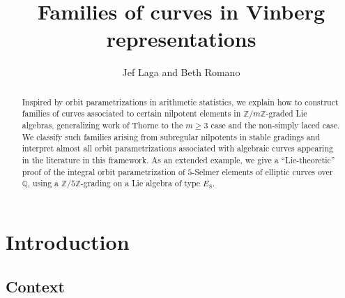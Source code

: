 \documentclass{article} %
\title{Families of curves in Vinberg representations}
\author{Jef Laga and Beth Romano}
\numberwithin{equation}{section}
\theoremstyle{definition}
\newcommand{\Q}{\mathbb{Q}}
\newcommand{\Z}{\mathbb{Z}}
\begin{document}
\maketitle


\begin{abstract}
Inspired by orbit parametrizations in arithmetic statistics, we explain how to construct families of curves associated to certain nilpotent elements in $\Z/m\Z$-graded Lie algebras, generalizing work of Thorne to the $m\geq 3$ case and the non-simply laced case.
We classify such families arising from subregular nilpotents in stable gradings and interpret almost all orbit parametrizations associated with algebraic curves appearing in the literature in this framework.
As an extended example, we give a ``Lie-theoretic'' proof of the integral orbit parametrization of $5$-Selmer elements of elliptic curves over $\Q$, using a $\Z/5\Z$-grading on a Lie algebra of type $E_8$.
\end{abstract}

\tableofcontents





\section{Introduction}


\subsection{Context}
\end{document}
